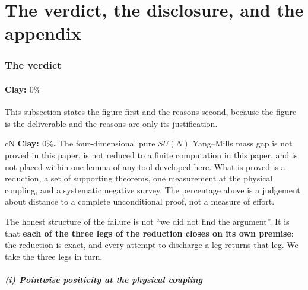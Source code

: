 \clearpage
\part{The verdict, the disclosure, and the appendix}

\section{The verdict}
\label{sec:verdict}

\subsection{Clay: \texorpdfstring{$0\%$}{0 percent}}
\label{sec:verdict-clay}

This subsection states the figure first and the reasons second, because the figure is the
deliverable and the reasons are only its justification.

\begin{claimbox}{cN}
\textbf{Clay: $0\%$.} The four-dimensional pure $SU(N)$ Yang--Mills mass gap is not proved in
this paper, is not reduced to a finite computation in this paper, and is not placed within one
lemma of any tool developed here. What is proved is a reduction, a set of supporting theorems, one
measurement at the physical coupling, and a systematic negative survey. The percentage above is a
judgement about distance to a complete unconditional proof, not a measure of effort.
\end{claimbox}

The honest structure of the failure is not ``we did not find the argument''. It is that
\textbf{each of the three legs of the reduction closes on its own premise}: the reduction is exact,
and every attempt to discharge a leg returns that leg. We take the three legs in turn.

\subsubsection*{(i) Pointwise positivity at the physical coupling}

